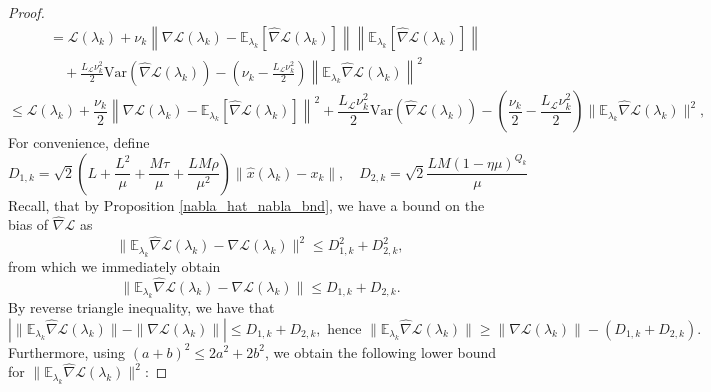 \documentclass[11pt, twoside]{report}
\begin{document}
\begin{proof}
\begin{align*}
  &= \mathcal{L}(\lambda_k) 
+ \nu_k \left\| \nabla \mathcal{L}(\lambda_k) 
  - \mathbb{E}_{\lambda_k} \left[ \widehat{\nabla} \mathcal{L}(\lambda_k) \right] \right\| 
  \left\| \mathbb{E}_{\lambda_k} \left[ \widehat{\nabla} \mathcal{L}(\lambda_k) \right] \right\| \\
&\quad 
+ \frac{L_{\mathcal{L}} \nu_k^2}{2} 
  \mathrm{Var} \left( \widehat{\nabla} \mathcal{L}(\lambda_k) \right) 
- \left( \nu_k 
  - \frac{L_{\mathcal{L}} \nu_k^2}{2} \right) 
  \left\| \mathbb{E}_{\lambda_k} \widehat{\nabla} \mathcal{L}(\lambda_k) \right\|^2
\end{align*}
\begin{equation} \label{Lip_to_sub}
    \leq \mathcal{L}(\lambda_k) + \frac{\nu_k}{2} \left\|\nabla \mathcal{L}(\lambda_k)- \mathbb{E}_{\lambda_k}\left[\widehat{\nabla}\mathcal{L}(\lambda_k)\right]\right\|^2 + \frac{L_{\mathcal{L}}\nu_k^2}{2}\mathrm{Var}(\widehat{\nabla}\mathcal{L}(\lambda_k)) - \left(\frac{\nu_k}{2} - \frac{L_{\mathcal{L}}\nu_k^2}{2}\right) \|\mathbb{E}_{\lambda_k} \widehat{\nabla}\mathcal{L}(\lambda_k)\|^2,
\end{equation}
For convenience, define
\[D_{1,k} = \sqrt{2}\left(L + \frac{L^2}{\mu} + \frac{M\tau}{\mu} + \frac{LM\rho}{\mu^2} \right) \|\hat{x}(\lambda_k) - x_k\|, \quad D_{2,k} = \sqrt{2} \frac{LM(1-\eta \mu)^{Q_k}}{\mu}\]
Recall, that by Proposition \ref{nabla_hat_nabla_bnd}, we have a bound on the bias of $\widehat{\nabla} \mathcal{L}$ as
\begin{equation} \label{T45diff}
    \|\mathbb{E}_{\lambda_k} \widehat{\nabla} \mathcal{L}(\lambda_k) - \nabla \mathcal{L}(\lambda_k)\|^2 \leq D_{1,k}^2  + D_{2,k}^2,
\end{equation}
from which we immediately obtain
\[\|\mathbb{E}_{\lambda_k} \widehat{\nabla} \mathcal{L}(\lambda_k) - \nabla \mathcal{L}(\lambda_k)\| \leq D_{1,k}  + D_{2,k}.\]
By reverse triangle inequality, we have that
\[\left| \|\mathbb{E}_{\lambda_k} \widehat{\nabla} \mathcal{L}(\lambda_k) \| - \|\nabla \mathcal{L}(\lambda_k)\| \right| \leq D_{1,k}+D_{2,k}, \text{ hence } \|\mathbb{E}_{\lambda_k} \widehat{\nabla} \mathcal{L}(\lambda_k) \| \geq \|\nabla \mathcal{L}(\lambda_k)\| -  (D_{1,k}+D_{2,k}).\]
Furthermore, using $(a+b)^2 \leq 2a^2 + 2b^2$, we obtain the following lower bound for $\|\mathbb{E}_{\lambda_k} \widehat{\nabla} \mathcal{L}(\lambda_k) \|^2$:

\end{proof}
\end{document}
